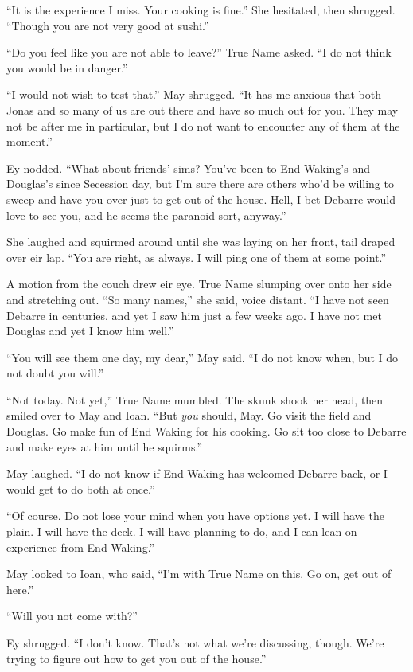 ``It is the experience I miss. Your cooking is fine.'' She hesitated, then shrugged. ``Though you are not very good at sushi.''

``Do you feel like you are not able to leave?'' True Name asked. ``I do not think you would be in danger.''

``I would not wish to test that.'' May shrugged. ``It has me anxious that both Jonas and so many of us are out there and have so much out for you. They may not be after me in particular, but I do not want to encounter any of them at the moment.''

Ey nodded. ``What about friends' sims? You've been to End Waking's and Douglas's since Secession day, but I'm sure there are others who'd be willing to sweep and have you over just to get out of the house. Hell, I bet Debarre would love to see you, and he seems the paranoid sort, anyway.''

She laughed and squirmed around until she was laying on her front, tail draped over eir lap. ``You are right, as always. I will ping one of them at some point.''

A motion from the couch drew eir eye. True Name slumping over onto her side and stretching out. ``So many names,'' she said, voice distant. ``I have not seen Debarre in centuries, and yet I saw him just a few weeks ago. I have not met Douglas and yet I know him well.''

``You will see them one day, my dear,'' May said. ``I do not know when, but I do not doubt you will.''

``Not today. Not yet,'' True Name mumbled. The skunk shook her head, then smiled over to May and Ioan. ``But \emph{you} should, May. Go visit the field and Douglas. Go make fun of End Waking for his cooking. Go sit too close to Debarre and make eyes at him until he squirms.''

May laughed. ``I do not know if End Waking has welcomed Debarre back, or I would get to do both at once.''

``Of course. Do not lose your mind when you have options yet. I will have the plain. I will have the deck. I will have planning to do, and I can lean on experience from End Waking.''

May looked to Ioan, who said, ``I'm with True Name on this. Go on, get out of here.''

``Will you not come with?''

Ey shrugged. ``I don't know. That's not what we're discussing, though. We're trying to figure out how to get you out of the house.''

